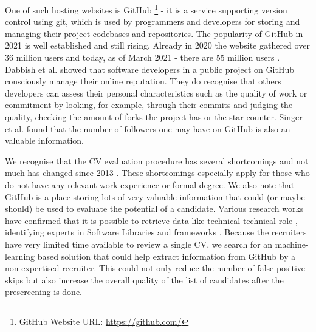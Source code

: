One of such hosting websites is GitHub \footnote{GitHub Website URL: \url{https://github.com/}} - it is a service supporting version control using git, which is used by programmers and developers for storing and managing their project codebases and repositories. The popularity of GitHub in 2021 is well established and still rising. Already in 2020 the website gathered over 36 million users \cite{GitHubUsers2020} and today, as of March 2021 - there are 55 million users \cite{GitHubUsers2021}. Dabbish et al. \cite{DabbishC} showed that software developers in a public project on GitHub consciously manage their online reputation. They do recognise that others developers can assess their personal characteristics such as the quality of work or commitment by looking, for example, through their commits and judging the quality, checking the amount of forks the project has or the star counter. Singer et al. \cite{Singer} found that the number of followers one may have on GitHub is also an valuable information.

We recognise that the CV evaluation procedure has several shortcomings and not much has changed since 2013 \cite{Capiluppi}. These shortcomings especially apply for those who do not have any relevant work experience or formal degree. We also note that GitHub is a place storing lots of very valuable information that could (or maybe should) be used to evaluate the potential of a candidate. Various research works have confirmed that it is possible to retrieve data like technical technical role \cite{TechnicalRole}, identifying experts in Software Libraries and frameworks \cite{SoftwareLibraries}. Because the recruiters have very limited time available to review a single CV, we search for an machine-learning based solution that could help extract information from GitHub by a non-expertised recruiter. This could not only reduce the number of false-positive skips but also increase the overall quality of the list of candidates after the prescreening is done.
